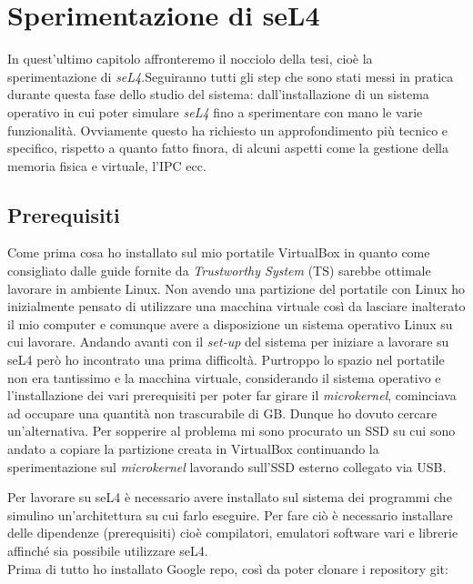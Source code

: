 \chapter{Sperimentazione di seL4}
In quest'ultimo capitolo affronteremo il nocciolo della tesi, cioè la sperimentazione di \textit{seL4}.Seguiranno tutti gli step che sono stati messi in pratica durante questa fase dello studio del sistema: dall'installazione di un sistema operativo in cui poter simulare \textit{seL4} fino a sperimentare con mano le varie funzionalità. Ovviamente questo ha richiesto un approfondimento più tecnico e specifico, rispetto a quanto fatto finora, di alcuni aspetti come la gestione della memoria fisica e virtuale, l'IPC ecc.

\section{Prerequisiti}
Come prima cosa ho installato sul mio portatile VirtualBox in quanto come consigliato dalle guide fornite da \textit{Trustworthy System} (TS) sarebbe ottimale lavorare in ambiente Linux. Non avendo una partizione del portatile con Linux ho inizialmente pensato di utilizzare una macchina virtuale così da lasciare inalterato il mio computer e comunque avere a disposizione un sistema operativo Linux su cui lavorare. Andando avanti con il \textit{set-up} del sistema per iniziare a lavorare su seL4 però ho incontrato una prima difficoltà. Purtroppo lo spazio nel portatile non era tantissimo e la macchina virtuale, considerando il sistema operativo e l'installazione dei vari prerequisiti per poter far girare il \textit{microkernel}, cominciava ad occupare una quantità non trascurabile di GB. Dunque ho dovuto cercare un'alternativa. Per sopperire al problema mi sono procurato un SSD su cui sono andato a copiare la partizione creata in VirtualBox continuando la sperimentazione sul \textit{microkernel} lavorando sull'SSD esterno collegato via USB.

Per lavorare su seL4 è necessario avere installato sul sistema dei programmi che simulino un'architettura su cui farlo eseguire. Per fare ciò è necessario installare delle dipendenze (prerequisiti) cioè compilatori, emulatori software vari e librerie affinché sia possibile utilizzare seL4.\\
Prima di tutto ho installato Google repo, così da poter clonare i repository git:

